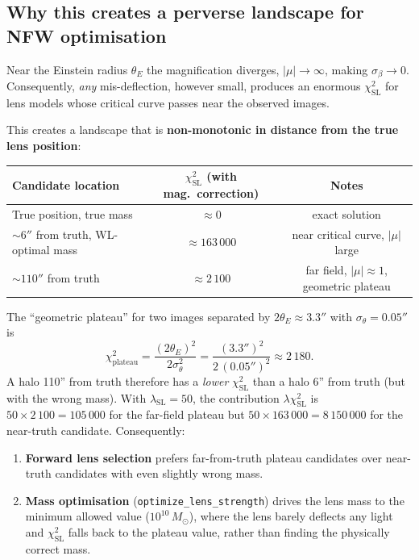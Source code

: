 \documentclass[12pt]{article}
\begin{document}
\subsection{Why this creates a perverse landscape for NFW optimisation}

Near the Einstein radius $\theta_E$ the magnification diverges, $|\mu|\to\infty$,
making $\sigma_\beta \to 0$.  Consequently, \emph{any} mis-deflection, however small,
produces an enormous $\chi^2_\mathrm{SL}$ for lens models whose critical curve passes
near the observed images.

This creates a landscape that is \textbf{non-monotonic in distance from the true lens position}:

\begin{center}
\begin{tabular}{lcc}
  \toprule
  Candidate location & $\chi^2_\mathrm{SL}$ (with mag.\ correction) & Notes\\
  \midrule
  True position, true mass & $\approx 0$ & exact solution\\
  $\sim 6''$ from truth, WL-optimal mass & $\approx 163\,000$ & near critical curve, $|\mu|$ large\\
  $\sim 110''$ from truth & $\approx 2\,100$ & far field, $|\mu|\approx 1$, geometric plateau\\
  \bottomrule
\end{tabular}
\end{center}

The ``geometric plateau'' for two images separated by $2\theta_E \approx 3.3''$ with
$\sigma_\theta = 0.05''$ is
\begin{equation}
  \chi^2_\mathrm{plateau} = \frac{(2\theta_E)^2}{2\sigma_\theta^2}
  = \frac{(3.3'')^2}{2\,(0.05'')^2} \approx 2\,180.
\end{equation}
A halo 110'' from truth therefore has a \emph{lower} $\chi^2_\mathrm{SL}$ than a halo
6'' from truth (but with the wrong mass).  With $\lambda_\mathrm{SL} = 50$, the
contribution $\lambda\chi^2_\mathrm{SL}$ is $50 \times 2\,100 = 105\,000$ for the
far-field plateau but $50 \times 163\,000 = 8\,150\,000$ for the near-truth
candidate.  Consequently:

\begin{enumerate}
  \item \textbf{Forward lens selection} prefers far-from-truth plateau candidates over
        near-truth candidates with even slightly wrong mass.
  \item \textbf{Mass optimisation} (\texttt{optimize\_lens\_strength}) drives the lens
        mass to the minimum allowed value ($10^{10}\,M_\odot$), where the lens barely
        deflects any light and $\chi^2_\mathrm{SL}$ falls back to the plateau value,
        rather than finding the physically correct mass.
\end{enumerate}
\end{document}
